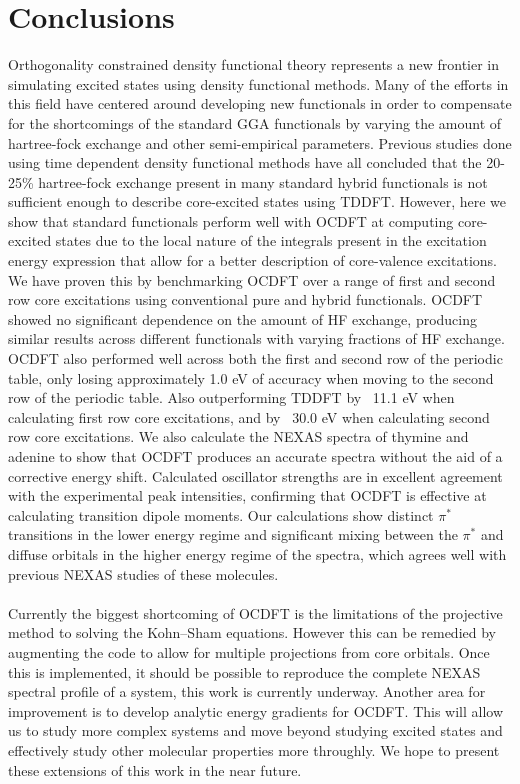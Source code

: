\documentclass[12pt]{article}
\begin{document}
\section{Conclusions}
Orthogonality constrained density functional theory represents a new frontier in simulating excited states using density functional methods. Many of the efforts in this field have centered around developing new functionals in order to compensate for the shortcomings of the standard GGA functionals by varying the amount of hartree-fock exchange and other semi-empirical parameters. Previous studies done using time dependent density functional methods have all concluded that the 20-25\% hartree-fock exchange present in many standard hybrid functionals is not sufficient enough to describe core-excited states using TDDFT. However, here we show that standard functionals perform well with OCDFT at computing core-excited states due to the local nature of the integrals present in the excitation energy expression that allow for a better description of core-valence excitations. We have proven this by benchmarking OCDFT over a range of first and second row core excitations using conventional pure and hybrid functionals. OCDFT showed no significant dependence on the amount of HF exchange, producing similar results across different functionals with varying fractions of HF exchange. OCDFT also performed well across both the first and second row of the periodic table, only losing approximately 1.0 eV of accuracy when moving to the second row of the periodic table. Also outperforming TDDFT by ~11.1 eV when calculating first row core excitations, and by ~30.0 eV when calculating second row core excitations. We also calculate the NEXAS spectra of thymine and adenine to show that OCDFT produces an accurate spectra without the aid of a corrective energy shift. Calculated oscillator strengths are in excellent agreement with the experimental peak intensities, confirming that OCDFT is effective at calculating transition dipole moments. Our calculations show distinct $\pi^*$ transitions in the lower energy regime and significant mixing between the $\pi^*$ and diffuse orbitals in the higher energy regime of the spectra, which agrees well with previous NEXAS studies of these molecules.
\\ \\ 
Currently the biggest shortcoming of OCDFT is the limitations of the projective method to solving the Kohn--Sham equations. However this can be remedied by augmenting the code to allow for multiple projections from core orbitals. Once this is implemented, it should be possible to reproduce the complete NEXAS spectral profile of a system, this work is currently underway. Another area for improvement is to develop analytic energy gradients for OCDFT. This will allow us to study more complex systems and move beyond studying excited states and effectively study other molecular properties more throughly. We hope to present these extensions of this work in the near future.
\footnotesize{
}
\end{document}
